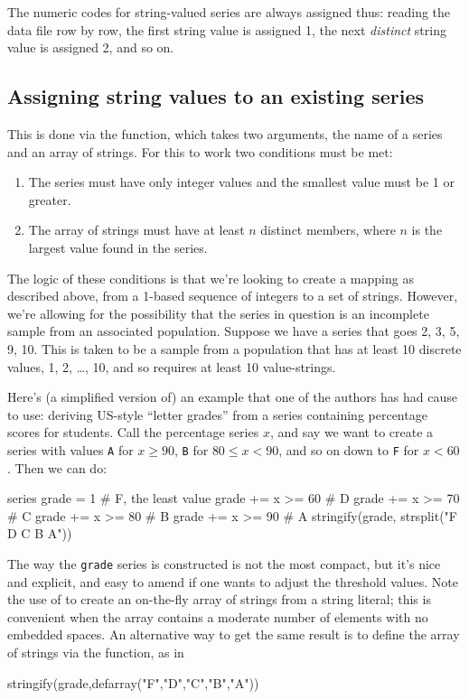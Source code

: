 The numeric codes for string-valued series are always assigned thus:
reading the data file row by row, the first string value is assigned
1, the next \textit{distinct} string value is assigned 2, and so on.

\subsection{Assigning string values to an existing series}
\label{sec:stringify}

This is done via the  function, which takes two
arguments, the name of a series and an array of strings. For this to
work two conditions must be met:

\begin{enumerate}
\item The series must have only integer values and the smallest value
  must be 1 or greater.
\item The array of strings must have at least $n$ distinct members,
  where $n$ is the largest value found in the series.
\end{enumerate}

The logic of these conditions is that we're looking to create a
mapping as described above, from a 1-based sequence of integers to a
set of strings. However, we're allowing for the possibility that the
series in question is an incomplete sample from an associated
population. Suppose we have a series that goes 2, 3, 5, 9, 10. This is
taken to be a sample from a population that has at least 10 discrete
values, 1, 2, \dots{}, 10, and so requires at least 10 value-strings.

Here's (a simplified version of) an example that one of the authors
has had cause to use: deriving US-style ``letter grades'' from a
series containing percentage scores for students. Call the percentage
series $x$, and say we want to create a series with values \texttt{A}
for $x \geq 90$, \texttt{B} for $80 \leq x <90$, and so on down to
\texttt{F} for $x<60$. Then we can do:
\begin{code}
series grade = 1 # F, the least value
grade += x >= 60 # D
grade += x >= 70 # C
grade += x >= 80 # B
grade += x >= 90 # A
stringify(grade, strsplit("F D C B A"))
\end{code}
%
The way the \texttt{grade} series is constructed is not the most
compact, but it's nice and explicit, and easy to amend if one wants to
adjust the threshold values. Note the use of  to
create an on-the-fly array of strings from a string literal; this is
convenient when the array contains a moderate number of elements with
no embedded spaces. An alternative way to get the same result is to
define the array of strings via the  function, as in
\begin{code}
stringify(grade,defarray("F","D","C","B","A"))
\end{code}



